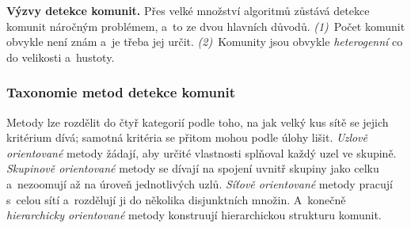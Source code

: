 \documentclass[11pt,a4paper]{article}
\theoremstyle{definition}
\begin{document}
\textbf{Výzvy detekce komunit.} Přes velké množství algoritmů zůstává detekce komunit náročným
problémem, a~to ze dvou hlavních důvodů. \emph{(1)}~Počet komunit obvykle není znám a~je třeba
jej určit. \emph{(2)}~Komunity jsou obvykle \emph{heterogenní} co do velikosti a~hustoty.

\subsubsection{Taxonomie metod detekce komunit}

Metody lze rozdělit do čtyř kategorií podle toho, na jak velký kus sítě se jejich kritérium
dívá; samotná kritéria se přitom mohou podle úlohy lišit. \emph{Uzlově orientované} metody
žádají, aby určité vlastnosti splňoval každý uzel ve skupině. \emph{Skupinově orientované}
metody se dívají na spojení uvnitř skupiny jako celku a~nezoomují až na úroveň jednotlivých
uzlů. \emph{Síťově orientované} metody pracují s~celou sítí a~rozdělují ji do několika
disjunktních množin. A~konečně \emph{hierarchicky orientované} metody konstruují hierarchickou
strukturu komunit.
\end{document}
